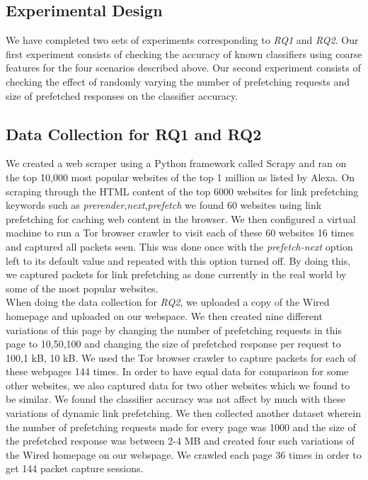 \subsection{Experimental Design}
We have completed two sets of experiments corresponding to \emph{RQ1} and
\emph{RQ2}. Our first experiment consists of checking the accuracy of
known classifiers using coarse features for the four scenarios described
above. Our second experiment consists of checking the effect of randomly
varying the number of prefetching requests and size of prefetched
responses on the classifier accuracy.

\subsection{Data Collection for RQ1 and RQ2}
We created a web scraper using a Python framework called
Scrapy\cite{scrapy} and ran on the top 10,000 most popular websites of
the top 1 million as
listed by Alexa\cite{alexa-top}. On scraping through the HTML content of
the top 6000 websites for link prefetching keywords such as
\textit{prerender},\textit{next},\textit{prefetch} we found 60 websites
using link prefetching for caching web content in the browser. We then
configured a virtual machine to run a Tor browser crawler\cite{tor-browser-crawler} to visit each
of these 60 websites 16 times and captured all packets seen. This was
done once with the \textit{prefetch-next} option left to its default
value and repeated with this option turned off. By doing this, we
captured packets for link prefetching as done currently in the real
world by some of the most popular websites. \\
When doing the data collection for \emph{RQ2}, we uploaded a copy of
the Wired homepage\cite{wired} and uploaded on our
webspace\cite{tj-wired}. We then created nine different variations of
this page by changing the number of prefetching requests in this page to
10,50,100 and changing the size of prefetched response per request to
100,1 kB, 10 kB. We used the Tor browser
crawler\cite{tor-browser-crawler} to capture packets for each of these
webpages 144 times. In order to have equal data for comparison for some
other websites, we also captured data for two other websites which we
found to be similar.
We found the classifier accuracy was not affect by much with these variations of dynamic link prefetching. 
We then collected another dataset wherein the number of prefetching requests made for every page was 1000 and the size of the prefetched response was between 2-4 MB and created four such variations of the Wired homepage on our webspage\cite{tj-wired}. 
We crawled each page 36 times in order to get 144 packet capture sessions.


